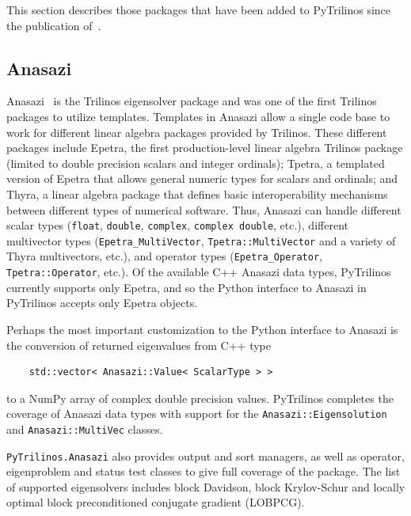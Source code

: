 \documentclass[11pt]{article}
\begin{document}
This section describes those packages that have been added to PyTrilinos since the publication of~\cite{PyTrilinos}.

\subsection{Anasazi}
\label{sec:anasazi}

Anasazi~\cite{Anasazi} is the Trilinos eigensolver package and was one of the first Trilinos packages to utilize templates.  Templates in Anasazi allow a single code base to work for different linear algebra packages provided by Trilinos.  These different packages include Epetra, the first production-level linear algebra Trilinos package (limited to double precision scalars and integer ordinals); Tpetra, a templated version of Epetra that allows general numeric types for scalars and ordinals; and Thyra, a linear algebra package that defines basic interoperability mechanisms between different types of numerical software.  Thus, Anasazi can handle different scalar types ({\tt float}, {\tt double}, {\tt complex}, {\tt complex double}, etc.), different multivector types ({\tt Epetra\_MultiVector}, {\tt Tpetra::MultiVector} and a variety of Thyra multivectors, etc.), and operator types ({\tt Epetra\_Operator}, {\tt Tpetra::Operator}, etc.).  Of the available C++ Anasazi data types, PyTrilinos currently supports only Epetra, and so the Python interface to Anasazi in PyTrilinos accepts only Epetra objects.

Perhaps the most important customization to the Python interface to Anasazi is the conversion of returned eigenvalues from C++ type
\begin{verbatim}
    std::vector< Anasazi::Value< ScalarType > >
\end{verbatim}
to a NumPy array of complex double precision values.  PyTrilinos completes the coverage of Anasazi data types with support for the {\tt Anasazi::Eigensolution} and {\tt Anasazi::MultiVec} classes.

{\tt PyTrilinos.Anasazi} also provides output and sort managers, as well as operator, eigenproblem and status test classes to give full coverage of the package.  The list of supported eigensolvers includes block Davidson, block Krylov-Schur and locally optimal block preconditioned conjugate gradient (LOBPCG).
\end{document}
